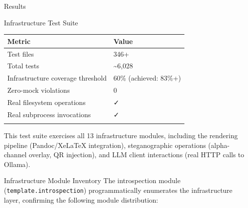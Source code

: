 \documentclass[
  ignorenonframetext,
]{beamer}
\newcounter{none} %
\begin{document}
\begin{frame}[fragile]{Results}
\begin{block}{Infrastructure Test Suite}
{\def\LTcaptype{none} %
\begin{longtable}[]{@{}ll@{}}
\toprule\noalign{}
Metric & Value \\
\midrule\noalign{}
\endhead
Test files & 346+ \\
Total tests & \textasciitilde6,028 \\
Infrastructure coverage threshold & 60\% (achieved: 83\%+) \\
Zero-mock violations & 0 \\
Real filesystem operations & ✓ \\
Real subprocess invocations & ✓ \\
\bottomrule\noalign{}
\end{longtable}
}

This test suite exercises all 13 infrastructure modules, including the
rendering pipeline (Pandoc/XeLaTeX integration), steganographic
operations (alpha-channel overlay, QR injection), and LLM client
interactions (real HTTP calls to Ollama).
\end{block}

\begin{block}{Infrastructure Module Inventory}
\protect{}\label{infrastructure-module-inventory}
The introspection module (\texttt{template.introspection})
programmatically enumerates the infrastructure layer, confirming the
following module distribution:


\end{block}
\end{frame}
\end{document}
